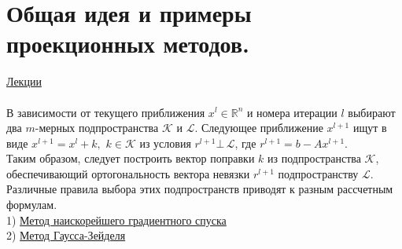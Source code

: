 \documentclass[specialist, subf, href, colorlinks=true, 12pt, times, mtpro, final]{disser}
\theoremstyle{definition}
\begin{document}
\section {Общая идея и примеры проекционных методов.}
	\hyperlink {lects.74}{Лекции}\\
	\\
	В зависимости от текущего приближения $x^l \in \mathds{R}^n$ и номера итерации $l$
	выбирают два $m$-мерных подпространства $\mathcal{K}$ и $\mathcal{L}$. Следующее
	приближение $x^{l+1}$ ищут в виде $x^{l+1} = x^l + k, \,\, k\in \mathcal{K}$ из
	условия $r^{l+1} \bot\, \mathcal{L}$, где $r^{l+1} = b - Ax^{l+1}$.\\
	Таким образом, следует построить вектор поправки $k$ из подпространства $\mathcal{K}$,
	обеспечивающий ортогональность вектора невязки $r^{l+1}$ подпространству $\mathcal{L}$.
	Различные правила выбора этих подпространств приводят к разным рассчетным формулам.
	\\
	1) \hyperlink {lects.74}{Метод наискорейшего градиентного спуска}\\
	2) \hyperlink {lects.74}{Метод Гаусса-Зейделя}
\end{document}
